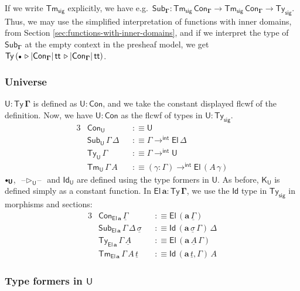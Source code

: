 \documentclass[12pt,a4paper,twoside,openany]{book}
\theoremstyle{remark}
\theoremstyle{definition}
\theoremstyle{theorem}
\newcommand{\ms}[1]{\mathsf{#1}}
\newcommand{\bs}[1]{\boldsymbol{#1}}
\newcommand{\toind}{\to^{\ms{int}}}
\newcommand{\Tys}{\ms{Ty_{sig}}}
\newcommand{\Tms}{\ms{Tm_{sig}}}
\newcommand{\Con}{\mathsf{Con}}
\newcommand{\Sub}{\mathsf{Sub}}
\newcommand{\Tm}{\mathsf{Tm}}
\newcommand{\Ty}{\mathsf{Ty}}
\newcommand{\U}{\mathsf{U}}
\newcommand{\El}{\mathsf{El}}
\newcommand{\Id}{\mathsf{Id}}
\renewcommand{\tt}{\mathsf{tt}}
\newcommand{\blank}{\mathord{\hspace{1pt}\text{--}\hspace{1pt}}}
\newcommand{\ext}{\triangleright}
\newcommand{\emptycon}{\scaleobj{.75}\bullet}
\newcommand{\K}{\mathsf{K}}
\newcommand{\bCon}{\bs{\Con}}
\newcommand{\bTy}{\bs{\Ty}}
\newcommand{\bGamma}{\bs{\Gamma}}
\newcommand{\ba}{\bs{a}}
\newcommand{\bU}{\bs{\U}}
\newcommand{\bEl}{\bs{\El}}
\newcommand{\ul}[1]{\underline{#1}}
\newcommand{\ulGamma}{\ul{\Gamma}}
\newcommand{\ulsigma}{\ul{\sigma}}
\newcommand{\ult}{\ul{t}}
\newcommand{\ulA}{\ul{A}}
\newcommand{\defn}{:\equiv}
\begin{document}
If we write $\Tms$ explicitly, we have e.g.\ $\Sub_{\bGamma} :
\Tms\,\Con_{\bGamma} \to \Tms\,\Con_{\bGamma} \to \Tys$. Thus, we may use the
simplified interpretation of functions with inner domains, from Section
\ref{sec:functions-with-inner-domains}, and if we interpret the type of
$\Sub_{\bGamma}$ at the empty context in the presheaf model, we get
$\Ty\,(\emptycon\,\ext|\Con_{\bGamma}|\,\tt\,\ext |\Con_{\bGamma}|\,\tt)$.

\subsubsection{Universe}

$\bU : \bTy\,\bGamma$ is defined as $\bU : \bCon$, and we take the constant
displayed flcwf of the definition. Now, we have $\bU : \bCon$ as the flcwf of
types in $\U : \Tys$.
\begingroup
\allowdisplaybreaks
\begin{alignat*}{3}
  &\Con_{\bU} && \defn \U \\
  &\Sub_{\bU}\,\Gamma\,\Delta && \defn \Gamma \toind \El\,\Delta\\
  &\Ty_{\bU}\,\Gamma && \defn \Gamma \toind \U\\
  &\Tm_{\bU}\,\Gamma\,A && \defn (\gamma : \Gamma) \toind \El\,(A\,\gamma)
\end{alignat*}
\endgroup
$\emptycon_{\bU}$, $\blank\ext_{\bU}\blank$ and $\Id_{\bU}$ are defined using
the type formers in $\U$. As before, $\K_{\bU}$ is defined simply as a constant
function.  In $\bEl\,\ba : \bTy\,\bGamma$, we use the $\Id$ type in $\Tys$ in
morphisms and sections:
\begin{alignat*}{3}
  &\Con_{\bEl\,\ba}\,\ulGamma && \defn \El\,(\ba\,\ulGamma) \\
  &\Sub_{\bEl\,\ba}\,\Gamma\,\Delta\,\ulsigma && \defn \Id\,(\ba\,\ulsigma\,\Gamma)\,\Delta\\
  &\Ty_{\bEl\,\ba}\,\Gamma\,\ulA && \defn \El\,(\ba\,\ulA\,\Gamma)\\
  &\Tm_{\bEl\,\ba}\,\Gamma\,A\,\ult && \defn \Id\,(\ba\,\ult,\Gamma)\,A
\end{alignat*}

\subsubsection{Type formers in $\bU$}
\end{document}
